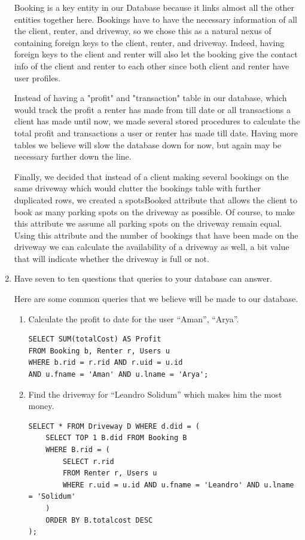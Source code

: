 \documentclass[a4paper]{article}
\begin{document}
\begin{enumerate}
Booking is a key entity in our Database because it links almost all the other entities together here. Bookings have to have the necessary information of all the client, renter, and driveway, so we chose this as a natural nexus of containing foreign keys to the client, renter, and driveway. Indeed, having foreign keys to the client and renter will also let the booking give the contact info of the client and renter to each other since both client and renter have user profiles. 

Instead of having a "profit" and "transaction" table in our database, which would track the profit a renter has made from till date or all transactions a client has made until now, we made several stored procedures to calculate the total profit and transactions a user or renter has made till date. Having more tables we believe will slow the database down for now, but again may be necessary further down the line. 

Finally, we decided that instead of a client making several bookings on the same driveway which would clutter the bookings table with further duplicated rows, we created a spotsBooked attribute that allows the client to book as many parking spots on the driveway as possible. Of course, to make this attribute we assume all parking spots on the driveway remain equal. Using this attribute and the number of bookings that have been made on the driveway we can calculate the availability of a driveway as well, a bit value that will indicate whether the driveway is full or not. 
\\ 
\item Have seven to ten questions that queries to your database can answer.

Here are some common queries that we believe will be made to our database.

\begin{enumerate}
\item Calculate the profit to date for the user “Aman”, “Arya”.

\begin{verbatim}
SELECT SUM(totalCost) AS Profit 
FROM Booking b, Renter r, Users u 
WHERE b.rid = r.rid AND r.uid = u.id 
AND u.fname = 'Aman' AND u.lname = 'Arya';
\end{verbatim}

\item Find the driveway for “Leandro Solidum” which makes him the most money.

\begin{verbatim}
SELECT * FROM Driveway D WHERE d.did = ( 
	SELECT TOP 1 B.did FROM Booking B 
	WHERE B.rid = ( 
		SELECT r.rid 
		FROM Renter r, Users u 
		WHERE r.uid = u.id AND u.fname = 'Leandro' AND u.lname = 'Solidum' 
	) 
	ORDER BY B.totalcost DESC 
);
\end{verbatim}


\end{enumerate}
\end{enumerate}
\end{document}
